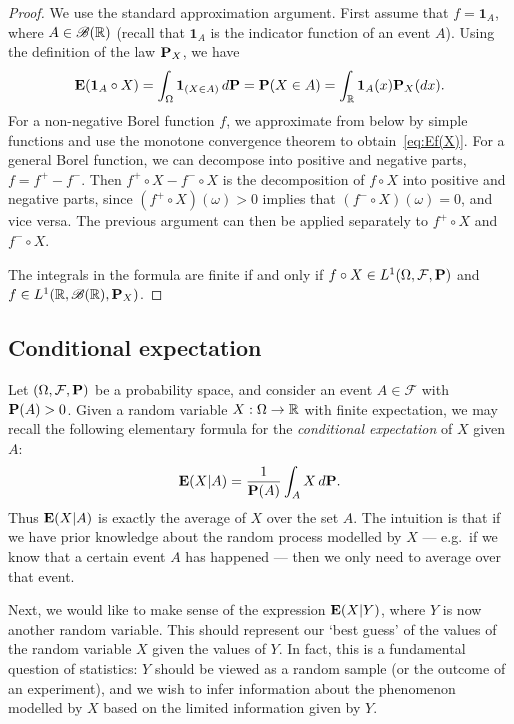 \begin{proof}
    We use the standard approximation argument. First assume that $f=\mathbf{1}_A$, where $A\in\mathscr{B}(\mathbb{R})$ (recall that $\mathbf{1}_A$ is the indicator function of an event $A$). Using the definition of the law $\mathbf{P}_X$, we have
    \begin{equation*}
        \mathbf{E}(\mathbf{1}_A\circ X) = \int_\Omega \mathbf{1}_{(X\in A)}\,d\mathbf{P} = \mathbf{P}(X\in A) = \int_{\mathbb{R}} \mathbf{1}_A(x)\mathbf{P}_X(dx).
    \end{equation*}
    For a non-negative Borel function $f$, we approximate from below by simple functions and use the monotone convergence theorem to obtain~\eqref{eq:Ef(X)}. For a general Borel function, we can decompose into positive and negative parts, $f=f^+ -f^-$. Then $f^+\circ X - f^-\circ X$ is the decomposition of $f\circ X$ into positive and negative parts, since $(f^+\circ X)(\omega)>0$ implies that $(f^-\circ X)(\omega)=0$, and vice versa. The previous argument can then be applied separately to $f^+\circ X$ and $f^-\circ X$.
    
    The integrals in the formula are finite if and only if $f\circ X\in L^1(\Omega,\mathcal{F},\mathbf{P})$ and $f\in L^1(\mathbb{R},\mathscr{B}(\mathbb{R}),\mathbf{P}_X)$.
\end{proof}

\subsection{Conditional expectation}

Let $(\Omega, \mathcal{F}, \mathbf{P})$ be a probability space, and consider an event $A \in\mathcal{F}$ with $\mathbf{P}(A) > 0$. Given a random variable $X : \Omega\to\mathbb{R}$ with finite expectation, we may recall the following elementary formula for the \emph{conditional expectation} of $X$ given $A$:
\begin{equation}
\label{eq:condex-elem}
    \mathbf{E}(X|A) = \frac{1}{\mathbf{P}(A)}\int_A X\,d\mathbf{P}.
\end{equation}
Thus $\mathbf{E}(X|A)$ is exactly the average of $X$ over the set $A$. The intuition is that if we have prior knowledge about the random process modelled by $X$ --- e.g.\ if we know that a certain event $A$ has happened --- then we only need to average over that event.

Next, we would like to make sense of the expression $\mathbf{E}(X|Y)$, where $Y$ is now another random variable. This should represent our `best guess' of the values of the random variable $X$ given the values of $Y$. In fact, this is a fundamental question of statistics: $Y$ should be viewed as a random sample (or the outcome of an experiment), and we wish to infer information about the phenomenon modelled by $X$ based on the limited information given by $Y$.

